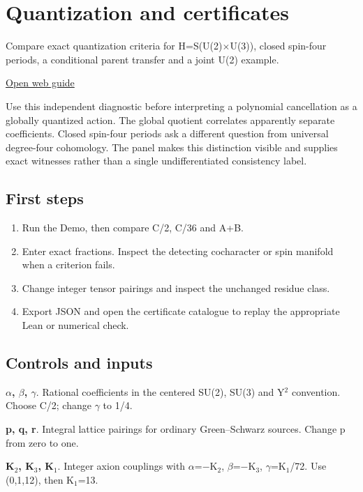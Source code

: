 \documentclass[11pt,a4paper]{article}
\begin{document}
\section{Quantization and certificates}
Compare exact quantization criteria for H=S(U(2)\ensuremath{\times}U(3)), closed spin-four periods, a conditional parent transfer and a joint U(2) example.

\href{https://karlesmarin.github.io/ghu-explorer/guide/quantization/index.html}{Open web guide}

Use this independent diagnostic before interpreting a polynomial cancellation as a globally quantized action. The global quotient correlates apparently separate coefficients. Closed spin-four periods ask a different question from universal degree-four cohomology. The panel makes this distinction visible and supplies exact witnesses rather than a single undifferentiated consistency label.
\subsection*{First steps}
\begin{enumerate}
\item Run the Demo, then compare C/2, C/36 and A+B.
\item Enter exact fractions. Inspect the detecting cocharacter or spin manifold when a criterion fails.
\item Change integer tensor pairings and inspect the unchanged residue class.
\item Export JSON and open the certificate catalogue to replay the appropriate Lean or numerical check.
\end{enumerate}
\subsection*{Controls and inputs}
\textbf{\ensuremath{\alpha}, \ensuremath{\beta}, \ensuremath{\gamma}}. Rational coefficients in the centered SU(2), SU(3) and Y\ensuremath{{}^{2}} convention. Choose C/2; change \ensuremath{\gamma} to 1/4.

\textbf{p, q, r}. Integral lattice pairings for ordinary Green--Schwarz sources. Change p from zero to one.

\textbf{K\ensuremath{{}_{2}}, K\ensuremath{{}_{3}}, K\ensuremath{{}_{1}}}. Integer axion couplings with \ensuremath{\alpha}=\ensuremath{-}K\ensuremath{{}_{2}}, \ensuremath{\beta}=\ensuremath{-}K\ensuremath{{}_{3}}, \ensuremath{\gamma}=K\ensuremath{{}_{1}}/72. Use (0,1,12), then K\ensuremath{{}_{1}}=13.
\end{document}
